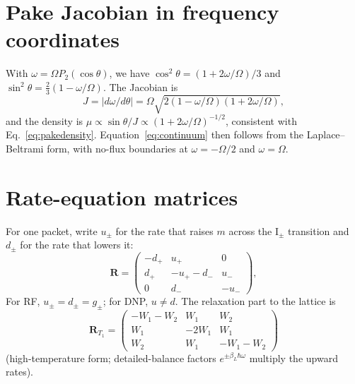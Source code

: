 \documentclass[11pt]{article}
\newcommand{\Pt}{P_2}
\begin{document}
\section{Pake Jacobian in frequency coordinates}
With $\omega=\Omega\Pt(\cos\theta)$, we have $\cos^2\theta=(1+2\omega/\Omega)/3$ and
$\sin^2\theta=\tfrac23(1-\omega/\Omega)$. The Jacobian is
\[
J=|d\omega/d\theta|=\Omega\sqrt{2(1-\omega/\Omega)(1+2\omega/\Omega)},
\]
and the density is $\mu\propto\sin\theta/J\propto(1+2\omega/\Omega)^{-1/2}$, consistent with
Eq.~\eqref{eq:pakedensity}. Equation~\eqref{eq:continuum} then follows from the
Laplace--Beltrami form, with no-flux boundaries at $\omega=-\Omega/2$ and $\omega=\Omega$.

\section{Rate-equation matrices}
For one packet, write $u_\pm$ for the rate that raises $m$ across the I$_\pm$ transition and
$d_\pm$ for the rate that lowers it:
\[
\bm R=\begin{pmatrix}-d_+&u_+&0\\ d_+&-u_+-d_-&u_-\\0&d_-&-u_-\end{pmatrix},
\]
For RF, $u_\pm=d_\pm=g_\pm$; for DNP, $u\neq d$. The relaxation part to the lattice is
\[
\bm R_{T_1}=\begin{pmatrix}-W_1-W_2&W_1&W_2\\W_1&-2W_1&W_1\\W_2&W_1&-W_1-W_2\end{pmatrix}
\]
(high-temperature form; detailed-balance factors $e^{\pm\beta_L\hbar\omega}$ multiply the
upward rates).
\end{document}
